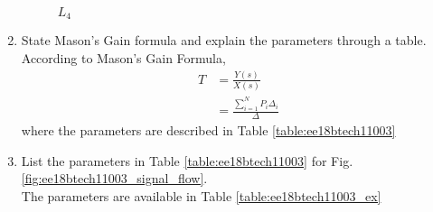 \begin{enumerate}[label=\thesection.\arabic*.,ref=\thesection.\theenumi]
\begin{figure}[!ht]
\begin{center}
		\resizebox{\columnwidth}{!}{}
	\end{center}
\caption{$L_4$}
\label{fig:ee18btech11003_L4}
\end{figure}

\renewcommand{\thefigure}{\theenumi}

\item State Mason's Gain formula and explain the parameters through a table.
\\
\solution 
According to Mason's Gain Formula,
\begin{align}
T &= \frac{Y(s)}{X(s)} 
\\
 &= \frac{\sum_{i=1}^{N} P_i\Delta_i}{\Delta}
\label{eq:ee18btech11003_mason}
\end{align}
%
where the parameters are described in Table \ref{table:ee18btech11003}
\begin{table}[!ht]
\centering

\caption{}
\label{table:ee18btech11003}
\end{table}
\item List the parameters in Table \ref{table:ee18btech11003}
for Fig. \ref{fig:ee18btech11003_signal_flow}.
\\
\solution The parameters are available in Table \ref{table:ee18btech11003_ex}

\begin{table}[!ht]
\centering

\caption{}
\label{table:ee18btech11003_ex}
\end{table}


\end{enumerate}
